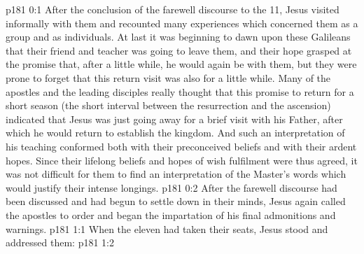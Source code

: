 \author{Midwayer Commission}
\vs p181 0:1 After the conclusion of the farewell discourse to the 11, Jesus visited informally with them and recounted many experiences which concerned them as a group and as individuals. At last it was beginning to dawn upon these Galileans that their friend and teacher was going to leave them, and their hope grasped at the promise that, after a little while, he would again be with them, but they were prone to forget that this return visit was also for a little while. Many of the apostles and the leading disciples really thought that this promise to return for a short season (the short interval between the resurrection and the ascension) indicated that Jesus was just going away for a brief visit with his Father, after which he would return to establish the kingdom. And such an interpretation of his teaching conformed both with their preconceived beliefs and with their ardent hopes. Since their lifelong beliefs and hopes of wish fulfilment were thus agreed, it was not difficult for them to find an interpretation of the Master’s words which would justify their intense longings.
\vs p181 0:2 After the farewell discourse had been discussed and had begun to settle down in their minds, Jesus again called the apostles to order and began the impartation of his final admonitions and warnings.
\vs p181 1:1 When the eleven had taken their seats, Jesus stood and addressed them: 
\vs p181 1:2 
